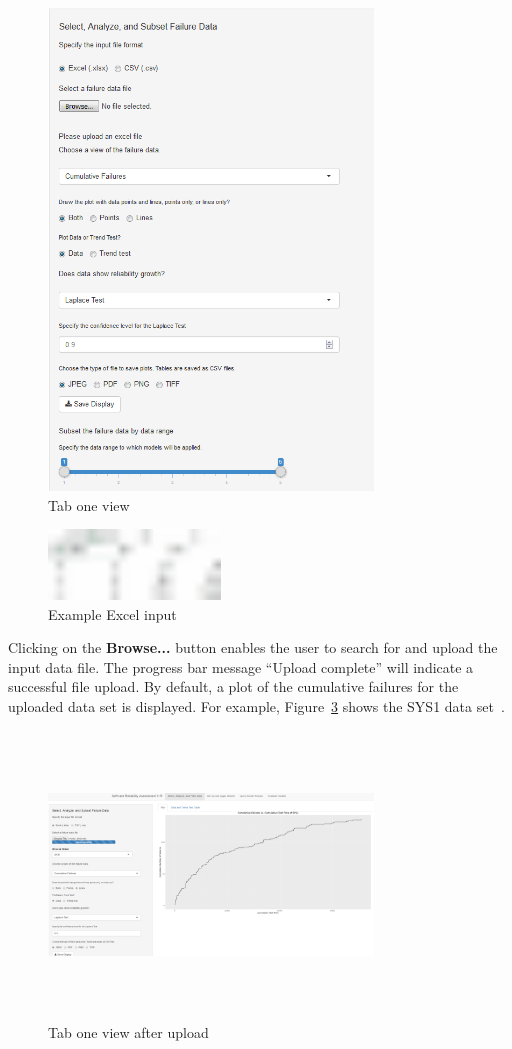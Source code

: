 \documentclass[conference]{IEEEtran}
\begin{document}
\begin{figure}[!h]
\centering
\includegraphics[width=3.4in]{Figures/Fig2}
\caption{Tab one view}
\label{fig_Tab1_leftCol}
\end{figure}

\begin{figure}[!h]
\centering
\includegraphics[width=1.8in]{Figures/sys1excel}
\caption{Example Excel input}
\label{fig_Excel_sys1}
\end{figure}

Clicking on the \textbf{Browse...} button enables the user to search for and upload the input data file. The progress bar message ``Upload complete'' will indicate a successful file upload. By default, a plot of the cumulative failures for the uploaded data set is displayed. For example, Figure~\ref{fig_Tab1_CDF} shows the SYS1 data set~\cite{BookHoSRE}.

\begin{figure}[!h]
\centering
\includegraphics[width=3.4in, height=3in]{Figures/Fig4}
\caption{Tab one view after upload}
\label{fig_Tab1_CDF}
\end{figure}
\end{document}
